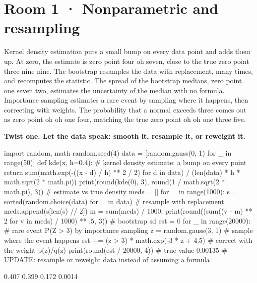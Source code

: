 \documentclass[11pt,a4paper]{report}
\begin{document}
\section*{Room 1 · Nonparametric and resampling}
Kernel density estimation puts a small bump on every data point and adds them up. At zero, the estimate is zero point four oh seven, close to the true zero point three nine nine. The bootstrap resamples the data with replacement, many times, and recomputes the statistic. The spread of the bootstrap medians, zero point one seven two, estimates the uncertainty of the median with no formula. Importance sampling estimates a rare event by sampling where it happens, then correcting with weights. The probability that a normal exceeds three comes out as zero point oh oh one four, matching the true zero point oh oh one three five.
\begin{tcolorbox}[colback=yellow!12,colframe=orange!70!black,boxrule=0.4pt,left=4pt,right=4pt,top=2pt,bottom=2pt]\textbf{Twist one. Let the data speak: smooth it, resample it, or reweight it.}\end{tcolorbox}
\begin{Code}
import random, math
random.seed(4)
data = [random.gauss(0, 1) for _ in range(50)]
def kde(x, h=0.4):                          # kernel density estimate: a bump on every point
    return sum(math.exp(-((x - d) / h) ** 2 / 2) for d in data) / (len(data) * h * math.sqrt(2 * math.pi))
print(round(kde(0), 3), round(1 / math.sqrt(2 * math.pi), 3))       # estimate vs true density
meds = []
for _ in range(1000):
    s = sorted(random.choice(data) for _ in data)   # resample with replacement
    meds.append(s[len(s) // 2])
m = sum(meds) / 1000; print(round((sum((v - m) ** 2 for v in meds) / 1000) ** .5, 3))   # bootstrap sd
est = 0
for _ in range(20000):                      # rare event P(Z > 3) by importance sampling
    z = random.gauss(3, 1)                  # sample where the event happens
    est += (z > 3) * math.exp(-3 * z + 4.5) # correct with the weight p(z)/q(z)
print(round(est / 20000, 4))                # true value 0.00135
# UPDATE: resample or reweight data instead of assuming a formula
\end{Code}
\begin{Out}
0.407 0.399
0.172
0.0014
\end{Out}
\end{document}
